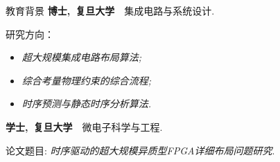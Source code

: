 \begin{rubric}{教育背景}
	\entry*[2021/9 -- 2026/6]%
	\textbf{博士,~复旦大学}~~集成电路与系统设计.
	\par 研究方向：
	\begin{itemize}
		\setlength{\itemsep}{-3pt}
		\item \emph{超大规模集成电路布局算法;}
		\item \emph{综合考量物理约束的综合流程;}
		\item \emph{时序预测与静态时序分析算法.}
	\end{itemize}

	\entry*[2017/9 -- 2021/6]%
	\textbf{学士,~复旦大学}~~微电子科学与工程.
	\par
	论文题目: \emph{时序驱动的超大规模异质型FPGA详细布局问题研究}.
\end{rubric}
